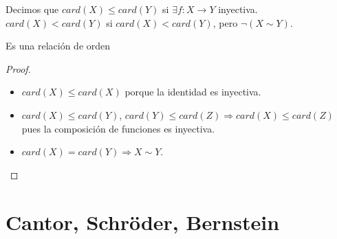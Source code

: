 \begin{definition}
    Decimos que \(card(X) \leq card(Y)\) si \(\exists f: X \to Y\) inyectiva. \\
    \(card(X) < card(Y)\) si \(card(X) < card(Y)\), pero \(\neg(X\sim Y)\).
\end{definition}

\begin{prop}
    Es una relación de orden
    \begin{proof}
        \begin{itemize}
            \item \(card(X) \leq card(X)\) porque la identidad es inyectiva.
            \item \(card(X) \leq card(Y)\), \(card(Y) \leq card(Z) \Rightarrow card(X) \leq card(Z)\) pues la composición de funciones es inyectiva.
            \item \(card(X) = card(Y) \Rightarrow X \sim Y\).
        \end{itemize}
    \end{proof}
\end{prop}

\section{Cantor, Schröder, Bernstein}

